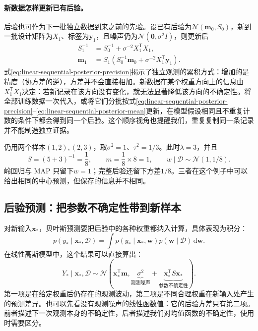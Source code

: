 \paragraph{新数据怎样更新已有后验。}
后验也可作为下一批独立数据到来之前的先验。设已有后验为$\mathcal N(\bm m_0,S_0)$，新到一批设计矩阵为$X_1$、标签为$\bm y_1$，且噪声仍为$\mathcal N(\bm0,\sigma^2I)$，则更新后
\begin{align}
 S_1^{-1}&=S_0^{-1}+\sigma^{-2}X_1^{\mathsf T}X_1,\label{eq:linear-sequential-posterior-precision}\\
 \bm m_1&=S_1\left(S_0^{-1}\bm m_0+\sigma^{-2}X_1^{\mathsf T}\bm y_1\right).
 \label{eq:linear-sequential-posterior-mean}
\end{align}
式\eqref{eq:linear-sequential-posterior-precision}揭示了独立观测的累积方式：增加的是精度（协方差的逆），方差并不会直接相加。新数据在某个权重方向上的信息由$X_1^{\mathsf T}X_1$决定：若新记录在该方向没有变化，就无法显著降低该方向的不确定性。将全部训练数据一次代入，或将它们分批按式\eqref{eq:linear-sequential-posterior-precision}--\eqref{eq:linear-sequential-posterior-mean}更新，在模型假设相同且不重复计数的条件下都会得到同一个后验。这个顺序视角也提醒我们，重复复制同一条记录并不能制造独立证据。

仍用两个样本$(1,2),(2,3)$，取$\sigma^2=1$、$\tau^2=1/3$。此时$\lambda=3$，并且
\begin{equation}
 S=(5+3)^{-1}=\frac18,\qquad m=\frac18\times8=1,
 \qquad w\mid\mathcal D\sim\mathcal N(1,1/8).
\end{equation}
岭回归与 MAP 只留下$w=1$；完整后验还留下方差$1/8$。三者在这个例子中可以给出相同的中心预测，但保存的信息并不相同。

\subsection{后验预测：把参数不确定性带到新样本}
对新输入$\bm x_*$，贝叶斯预测要把后验中的各种权重都纳入计算，具体表现为积分：
\begin{equation}
 p(y_*\mid\bm x_*,\mathcal D)=
 \int p(y_*\mid\bm x_*,\bm w)p(\bm w\mid\mathcal D)\,\mathrm d\bm w.
\end{equation}
在线性高斯模型中，这个结果可以直接算出：
\begin{equation}
 Y_*\mid\bm x_*,\mathcal D\sim
 \mathcal N(\bm x_*^{\mathsf T}\bm m,
 \underbrace{\sigma^2}_{\text{观测噪声}}
 +\underbrace{\bm x_*^{\mathsf T}S\bm x_*}_{\text{参数不确定性}}).
\end{equation}
第一项是在给定权重后仍存在的观测波动，第二项是不同合理权重在新输入处产生的预测差异。也可以先看没有观测噪声的线性函数值：它的后验方差只有第二项。前者描述下一次观测本身的不确定性，后者描述我们对均值函数的不确定性，使用时需要区分。

